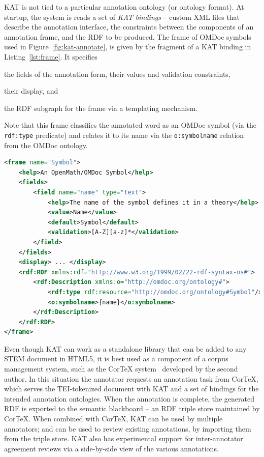 KAT is not tied to a particular annotation ontology (or ontology format). At startup, the system is reads a set of \textit{KAT bindings} -- custom XML files that describe the annotation interface, the constraints between the components of an annotation frame, and the RDF to be produced. The frame of OMDoc symbols used in Figure~\ref{fig:kat-annotate}, is given by the fragment of a KAT binding in Listing~\ref{lst:frame}. It specifies
\begin{inparaenum}[\em i\rm)]
\item the fields of the annotation form, their values and validation constraints,
\item their display, and
\item the RDF subgraph for the frame via a templating mechanism.
\end{inparaenum}
Note that this frame classifies the annotated word as an OMDoc symbol (via the \lstinline [basicstyle=\sf\normalsize]|rdf:type| predicate) and relates it to its name via the \lstinline[basicstyle=\sf\normalsize]|o:symbolname| relation from the OMDoc ontology.

\begin{lstlisting}[language=XML,label=lst:frame,
caption=A KAT Frame Specification for OMDoc Symbols]
<frame name="Symbol">
    <help>An OpenMath/OMDoc Symbol</help>
    <fields>
        <field name="name" type="text">
            <help>The name of the symbol defines it in a theory</help>
            <value>Name</value>
            <default>Symbol</default>
            <validation>[A-Z][a-z]*</validation>
        </field>
    </fields>
    <display> ... </display>
    <rdf:RDF xmlns:rdf="http://www.w3.org/1999/02/22-rdf-syntax-ns#">
        <rdf:Description xmlns:o="http://omdoc.org/ontology#">
            <rdf:type rdf:resource="http://omdoc.org/ontology#Symbol"/>
            <o:symbolname>{name}</o:symbolname>
        </rdf:Description>
    </rdf:RDF>
</frame>
\end{lstlisting} 

Even though KAT can work as a standalone library that can be added to any STEM document in HTML5, it is best used as a component of a corpus management system, such as the {Cor\TeX} system~\cite{CorTeX:on} developed by the second author. In this situation the annotator requests an annotation task from {Cor\TeX}, which serves the TEI-tokenized document with KAT and a set of bindings for the intended annotation ontologies. When the annotation is complete, the generated RDF is exported to the semantic blackboard -- an RDF triple store maintained by {Cor\TeX}. When combined with {Cor\TeX}, KAT can be used by multiple annotators; and can be used to review existing annotations, by importing them from the triple store.  KAT also has experimental support for inter-annotator agreement reviews via a side-by-side view of the various annotations.

